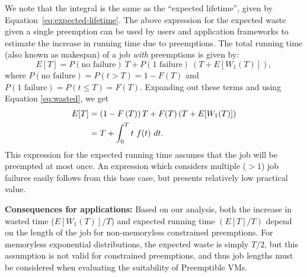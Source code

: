 We note that the integral is the same as the ``expected lifetime'', given by Equation~\ref{eq:expected-lifetime}.
%
The above expression for the expected waste given a single preemption can be used by users and application frameworks to estimate the increase in running time due to preemptions. %
The total running time (also known as makespan) of a job \emph{with} preemptions is given by:
\begin{equation}
  \label{eq:tot-run-time}
  E[T] = P(\text{no failure})~T + P(\text{1 failure})~\left(T + E[W_1(T)]\right),
\end{equation}
where $P(\text{no failure}) = P(t > T) =  1- F(T)$ and $P(\text{1 failure}) = P(t \leq T) = F(T)$.
Expanding out these terms and using Equation \ref{eq:wasted}, we get
%
\begin{align}
  \label{eq:tot-run-time-2}
  E[T] &= \left(1-F\left(T\right)\right)T + F(T)\left(T + E[W_1(T)]\right) \notag \\
  &= T + \int_0^{T} t~f(t)~dt.         
\end{align}
This expression for the expected running time assumes that the job will be preempted at most once.
An expression which considers multiple ($>1$) job failures easily follows from this base case, but presents relatively low practical value.



\noindent \textbf{Consequences for applications:}
Based on our analysis, both the increase in wasted time ($E[W_1(T)]/T$) and expected running time $(E[T]/T)$ depend on the length of the job for non-memoryless constrained preemptions. 
For memoryless exponential distributions, the expected waste is simply $T/2$, but this assumption is not valid for constrained preemptions, and thus job lengths must be considered when evaluating the suitability of Preemptible VMs. 


